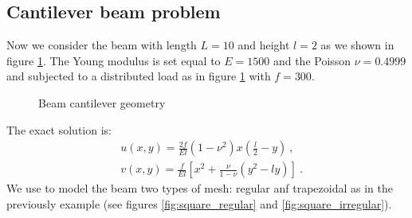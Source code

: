 \documentclass[preprint,12pt,authoryear]{elsarticle}
\begin{document}
\subsection{Cantilever beam problem}
Now we consider the beam with length $L=10$ and height $l=2$ as we shown in figure \ref{fig:beam_geometry}. The Young modulus is set equal to $E=1500$ and the Poisson $\nu=0.4999$ and subjected to a distributed load as in figure \ref{fig:beam_geometry} with $f=300$.
%
\begin{figure}[h!]
\begin{center}

\caption{Beam cantilever geometry \label{fig:beam_geometry}}
\end{center}
\end{figure}
%
The exact solution is:
\begin{equation}
\begin{split}
&u(x,y) = \frac{2 f}{E l} (1-\nu^{2}) x \left( \frac{l}{2} - y \right)\: , \\
&v(x,y) = \frac{f}{E l} \left[ x^{2} + \frac{\nu}{1-\nu}\left(y^{2}-l y 
\right) \right] \: .
\end{split}
\end{equation}
We use to model the beam two types of mesh: regular anf trapezoidal as in the previously example (see figures \ref{fig:square_regular} and \ref{fig:square_irregular}).
%
\end{document}
